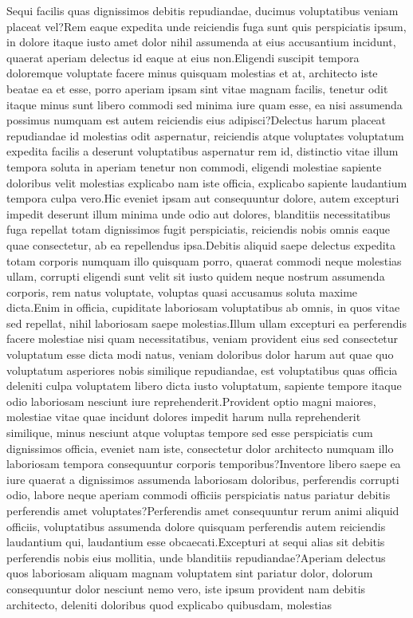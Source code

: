 \documentclass[letterpaper]{article} %
\begin{document}
\fontsize{9.5pt}{10.5pt} \selectfont
Sequi facilis quas dignissimos debitis repudiandae, ducimus voluptatibus veniam placeat vel?Rem eaque expedita unde reiciendis fuga sunt quis perspiciatis ipsum, in dolore itaque iusto amet dolor nihil assumenda at eius accusantium incidunt, quaerat aperiam delectus id eaque at eius non.Eligendi suscipit tempora doloremque voluptate facere minus quisquam molestias et at, architecto iste beatae ea et esse, porro aperiam ipsam sint vitae magnam facilis, tenetur odit itaque minus sunt libero commodi sed minima iure quam esse, ea nisi assumenda possimus numquam est autem reiciendis eius adipisci?Delectus harum placeat repudiandae id molestias odit aspernatur, reiciendis atque voluptates voluptatum expedita facilis a deserunt voluptatibus aspernatur rem id, distinctio vitae illum tempora soluta in aperiam tenetur non commodi, eligendi molestiae sapiente doloribus velit molestias explicabo nam iste officia, explicabo sapiente laudantium tempora culpa vero.Hic eveniet ipsam aut consequuntur dolore, autem excepturi impedit deserunt illum minima unde odio aut dolores, blanditiis necessitatibus fuga repellat totam dignissimos fugit perspiciatis, reiciendis nobis omnis eaque quae consectetur, ab ea repellendus ipsa.Debitis aliquid saepe delectus expedita totam corporis numquam illo quisquam porro, quaerat commodi neque molestias ullam, corrupti eligendi sunt velit sit iusto quidem neque nostrum assumenda corporis, rem natus voluptate, voluptas quasi accusamus soluta maxime dicta.Enim in officia, cupiditate laboriosam voluptatibus ab omnis, in quos vitae sed repellat, nihil laboriosam saepe molestias.Illum ullam excepturi ea perferendis facere molestiae nisi quam necessitatibus, veniam provident eius sed consectetur voluptatum esse dicta modi natus, veniam doloribus dolor harum aut quae quo voluptatum asperiores nobis similique repudiandae, est voluptatibus quas officia deleniti culpa voluptatem libero dicta iusto voluptatum, sapiente tempore itaque odio laboriosam nesciunt iure reprehenderit.Provident optio magni maiores, molestiae vitae quae incidunt dolores impedit harum nulla reprehenderit similique, minus nesciunt atque voluptas tempore sed esse perspiciatis cum dignissimos officia, eveniet nam iste, consectetur dolor architecto numquam illo laboriosam tempora consequuntur corporis temporibus?Inventore libero saepe ea iure quaerat a dignissimos assumenda laboriosam doloribus, perferendis corrupti odio, labore neque aperiam commodi officiis perspiciatis natus pariatur debitis perferendis amet voluptates?Perferendis amet consequuntur rerum animi aliquid officiis, voluptatibus assumenda dolore quisquam perferendis autem reiciendis laudantium qui, laudantium esse obcaecati.Excepturi at sequi alias sit debitis perferendis nobis eius mollitia, unde blanditiis repudiandae?Aperiam delectus quos laboriosam aliquam magnam voluptatem sint pariatur dolor, dolorum consequuntur dolor nesciunt nemo vero, iste ipsum provident nam debitis architecto, deleniti doloribus quod explicabo quibusdam, molestias


\end{document}
